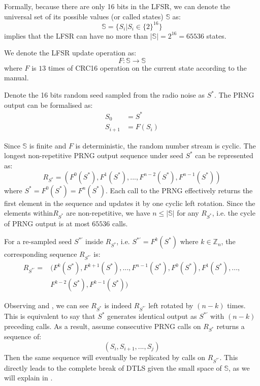 Formally, because there are only 16 bits in the LFSR, we can denote the universal set of its  possible values (or called states) $\mathbb{S}$ as:
\begin{equation} \label{PRNGState}
\mathbb{S} = \{ S_{i} | S_{i} \in \{2\}^{16}\}
\end{equation}
 implies that the LFSR can have no more than $|\mathbb{S}| = 2^{16} = 65536$ states.

We denote the LFSR update operation as:
\begin{equation}
F:\mathbb{S} \rightarrow \mathbb{S}
\end{equation}
where $F$ is $13$ times of CRC16 operation on the current state according to the manual.

Denote the 16 bits random seed sampled from the radio noise as $S^*$. The PRNG output can be formalised as:
\begin{equation}
	\begin{aligned}
	S_{0} &= S^* \\
	S_{i+1} &= F(S_{i})
	\end{aligned}
\end{equation}

Since $\mathbb{S}$ is finite and $F$ is deterministic, the random number stream is cyclic. The longest non-repetitive PRNG output sequence under seed $S^*$ can be represented as:
\begin{equation} \label{R*}
R_{S^*}= (F^0(S^{*}), F^{1}(S^{*}), ..., F^{n-2}(S^{*}), F^{n-1}(S^{*}))
\end{equation}
where $S^{*} = F^{0}(S^{*}) = F^{n}(S^{*})$. Each call to the PRNG effectively returns the first element in the sequence and updates it by one cyclic left rotation. Since the elements within$R_{S^*}$ are non-repetitive, we have $n \leq |\mathbb{S}|$ for any $R_{S^*}$, i.e. the cycle of PRNG output is at most $65536$ calls.

For a re-sampled seed $S^{*'}$ inside $R_{S^*}$, i.e. $S^{*'} = F^{k}(S^*)$ where $k \in \mathbb{Z}_n$, the corresponding sequence $R_{S^{*'}}$ is:
\begin{equation}\label{R*'}
	\begin{aligned}
	R_{S^{*'}} = &( F^{k}(S^*), F^{k+1}(S^{*}), ..., F^{n-1}(S^*), F^{0}(S^*), F^{1}(S^*),...,\\
	&F^{k-2}(S^{*}), F^{k-1}(S^{*}))
	\end{aligned}
\end{equation}

Observing  and , we can see $R_{S^*}$ is indeed $R_{S^{*'}}$ left rotated by $(n-k)$ times. This is equivalent to say that ${S^*}$ generates identical output as ${S^{*'}}$ with $(n-k)$ preceding calls. As a result, assume consecutive PRNG calls on $R_{S^*}$ returns a sequence of:
\begin{equation*}
(S_i, S_{i+1}, ..., S_{j})
\end{equation*}
Then the same sequence will eventually be replicated by calls on $R_{S^{*'}}$. This directly leads to the complete break of DTLS given the small space of $\mathbb{S}$, as we will explain in .


